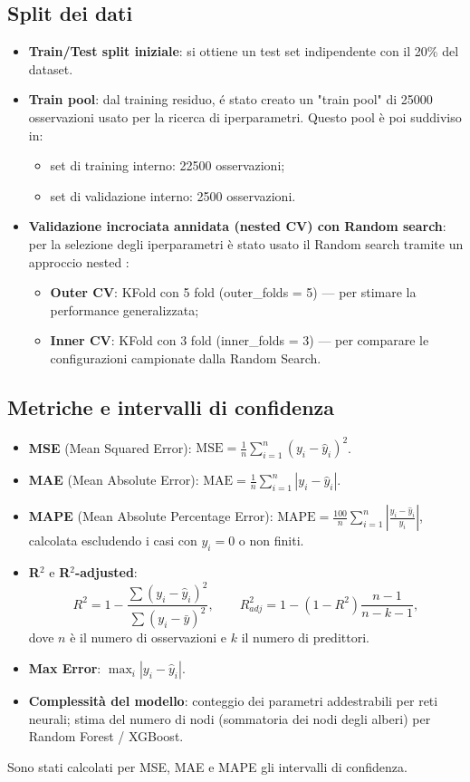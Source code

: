 \documentclass[a4paper,12pt]{report}
\begin{document}
	\subsection{Split dei dati}
	\begin{itemize}
		\item \textbf{Train/Test split iniziale}: si ottiene un test set indipendente con il 20\% del dataset.
		\item \textbf{Train pool}: dal training residuo, é stato creato un "train pool" di 25000 osservazioni usato per la ricerca di iperparametri. Questo pool è poi suddiviso in:
		\begin{itemize}
			\item set di training interno: 22500 osservazioni;
			\item set di validazione interno: 2500 osservazioni.
		\end{itemize}
		\item \textbf{Validazione incrociata annidata (nested CV) con Random search}: per la selezione degli iperparametri è stato usato il Random search tramite un approccio nested :
		\begin{itemize}
			\item \textbf{Outer CV}: KFold con 5 fold (outer\_folds = 5) — per stimare la performance generalizzata;
			\item \textbf{Inner CV}: KFold con 3 fold (inner\_folds = 3) — per comparare le configurazioni campionate dalla Random Search.
		\end{itemize}
	\end{itemize}
	
	\subsection{Metriche e intervalli di confidenza}
	\begin{itemize}
		\item \textbf{MSE} (Mean Squared Error): \(\text{MSE} = \frac{1}{n} \sum_{i=1}^{n} (y_i - \hat{y}_i)^2\).
		\item \textbf{MAE} (Mean Absolute Error): \(\text{MAE} = \frac{1}{n} \sum_{i=1}^{n} |y_i - \hat{y}_i|\).
		\item \textbf{MAPE} (Mean Absolute Percentage Error): \(\text{MAPE} = \frac{100}{n} \sum_{i=1}^{n} \left| \frac{y_i - \hat{y}_i}{y_i} \right|\), calcolata escludendo i casi con \(y_i=0\) o non finiti.
		\item \textbf{R\(^2\)} e \textbf{R\(^2\)-adjusted}:
		\[
		R^2 = 1 - \frac{\sum (y_i - \hat{y}_i)^2}{\sum (y_i - \bar{y})^2}, \qquad
		R^2_{adj} = 1 - (1 - R^2)\frac{n-1}{n-k-1},
		\]
		dove \(n\) è il numero di osservazioni e \(k\) il numero di predittori.
		\item \textbf{Max Error}: \(\max_i |y_i - \hat{y}_i|\).
		\item \textbf{Complessità del modello}: conteggio dei parametri addestrabili per reti neurali; stima del numero di nodi (sommatoria dei nodi degli alberi) per Random Forest / XGBoost.
	\end{itemize}
	Sono stati calcolati per MSE, MAE e MAPE gli intervalli di confidenza.
	
\end{document}
